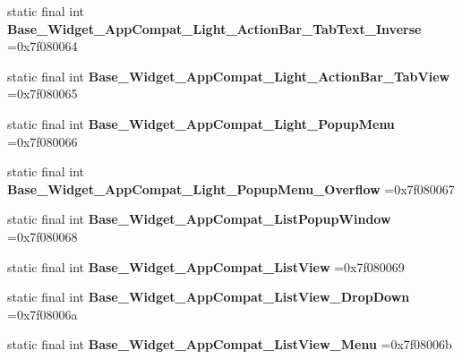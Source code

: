 \begin{DoxyCompactItemize}
\item 
\hypertarget{classcheck_1_1test_1_1_r_1_1style_a7dfc1eab1b564d1453259f894291ab08}{}static final int {\bfseries Base\+\_\+\+Widget\+\_\+\+App\+Compat\+\_\+\+Light\+\_\+\+Action\+Bar\+\_\+\+Tab\+Text\+\_\+\+Inverse} =0x7f080064\label{classcheck_1_1test_1_1_r_1_1style_a7dfc1eab1b564d1453259f894291ab08}

\item 
\hypertarget{classcheck_1_1test_1_1_r_1_1style_ae3afa71ec11604f814d6f5216dbc37ef}{}static final int {\bfseries Base\+\_\+\+Widget\+\_\+\+App\+Compat\+\_\+\+Light\+\_\+\+Action\+Bar\+\_\+\+Tab\+View} =0x7f080065\label{classcheck_1_1test_1_1_r_1_1style_ae3afa71ec11604f814d6f5216dbc37ef}

\item 
\hypertarget{classcheck_1_1test_1_1_r_1_1style_a632f7bc0e18eb75f9b11a1ca30f0cf23}{}static final int {\bfseries Base\+\_\+\+Widget\+\_\+\+App\+Compat\+\_\+\+Light\+\_\+\+Popup\+Menu} =0x7f080066\label{classcheck_1_1test_1_1_r_1_1style_a632f7bc0e18eb75f9b11a1ca30f0cf23}

\item 
\hypertarget{classcheck_1_1test_1_1_r_1_1style_a83ef3a86a74bef0ae892fb4664bd6a62}{}static final int {\bfseries Base\+\_\+\+Widget\+\_\+\+App\+Compat\+\_\+\+Light\+\_\+\+Popup\+Menu\+\_\+\+Overflow} =0x7f080067\label{classcheck_1_1test_1_1_r_1_1style_a83ef3a86a74bef0ae892fb4664bd6a62}

\item 
\hypertarget{classcheck_1_1test_1_1_r_1_1style_a53e7318208d7c278b8d0c0e8243a6e85}{}static final int {\bfseries Base\+\_\+\+Widget\+\_\+\+App\+Compat\+\_\+\+List\+Popup\+Window} =0x7f080068\label{classcheck_1_1test_1_1_r_1_1style_a53e7318208d7c278b8d0c0e8243a6e85}

\item 
\hypertarget{classcheck_1_1test_1_1_r_1_1style_ac1e4357e778f424fe25019540adbafaa}{}static final int {\bfseries Base\+\_\+\+Widget\+\_\+\+App\+Compat\+\_\+\+List\+View} =0x7f080069\label{classcheck_1_1test_1_1_r_1_1style_ac1e4357e778f424fe25019540adbafaa}

\item 
\hypertarget{classcheck_1_1test_1_1_r_1_1style_aa458f48e674f3a6995594f670fb8f018}{}static final int {\bfseries Base\+\_\+\+Widget\+\_\+\+App\+Compat\+\_\+\+List\+View\+\_\+\+Drop\+Down} =0x7f08006a\label{classcheck_1_1test_1_1_r_1_1style_aa458f48e674f3a6995594f670fb8f018}

\item 
\hypertarget{classcheck_1_1test_1_1_r_1_1style_aa4e0e4f8727711df3f926ae263234a40}{}static final int {\bfseries Base\+\_\+\+Widget\+\_\+\+App\+Compat\+\_\+\+List\+View\+\_\+\+Menu} =0x7f08006b\label{classcheck_1_1test_1_1_r_1_1style_aa4e0e4f8727711df3f926ae263234a40}


\end{DoxyCompactItemize}
